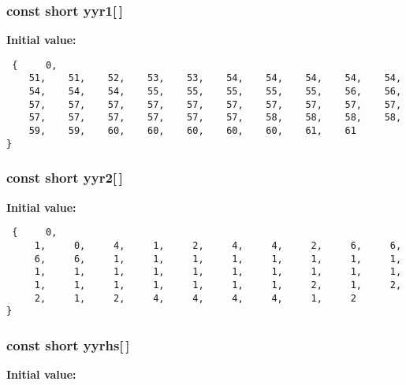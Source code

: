 \subsubsection{\setlength{\rightskip}{0pt plus 5cm}const short yyr1[$\,$]\hspace{0.3cm}{\tt  [static]}}\label{vcd__parser_8c_a88}


{\bf Initial value:}

\footnotesize\begin{verbatim} {     0,
    51,    51,    52,    53,    53,    54,    54,    54,    54,    54,
    54,    54,    54,    55,    55,    55,    55,    55,    56,    56,
    57,    57,    57,    57,    57,    57,    57,    57,    57,    57,
    57,    57,    57,    57,    57,    57,    58,    58,    58,    58,
    59,    59,    60,    60,    60,    60,    60,    61,    61
}\end{verbatim}\normalsize 
{}
\subsubsection{\setlength{\rightskip}{0pt plus 5cm}const short yyr2[$\,$]\hspace{0.3cm}{\tt  [static]}}\label{vcd__parser_8c_a89}


{\bf Initial value:}

\footnotesize\begin{verbatim} {     0,
     1,     0,     4,     1,     2,     4,     4,     2,     6,     6,
     6,     6,     1,     1,     1,     1,     1,     1,     1,     1,
     1,     1,     1,     1,     1,     1,     1,     1,     1,     1,
     1,     1,     1,     1,     1,     1,     1,     2,     1,     2,
     2,     1,     2,     4,     4,     4,     4,     1,     2
}\end{verbatim}\normalsize 
{}
\subsubsection{\setlength{\rightskip}{0pt plus 5cm}const short yyrhs[$\,$]\hspace{0.3cm}{\tt  [static]}}\label{vcd__parser_8c_a85}


{\bf Initial value:}

